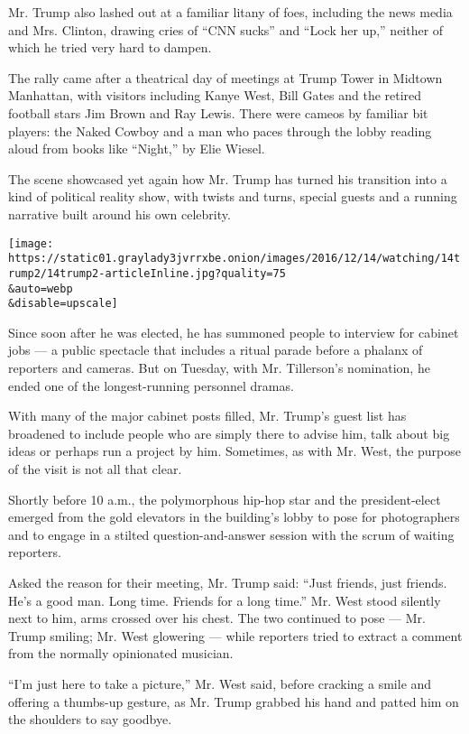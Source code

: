 Mr. Trump also lashed out at a familiar litany of foes, including the
news media and Mrs. Clinton, drawing cries of ``CNN sucks'' and ``Lock
her up,'' neither of which he tried very hard to dampen.

The rally came after a theatrical day of meetings at Trump Tower in
Midtown Manhattan, with visitors including Kanye West, Bill Gates and
the retired football stars Jim Brown and Ray Lewis. There were cameos by
familiar bit players: the Naked Cowboy and a man who paces through the
lobby reading aloud from books like ``Night,'' by Elie Wiesel.

The scene showcased yet again how Mr. Trump has turned his transition
into a kind of political reality show, with twists and turns, special
guests and a running narrative built around his own celebrity.

\texttt{[image: https://static01.graylady3jvrrxbe.onion/images/2016/12/14/watching/14trump2/14trump2-articleInline.jpg?quality=75\\\&auto=webp\\\&disable=upscale]}

Since soon after he was elected, he has summoned people to interview for
cabinet jobs --- a public spectacle that includes a ritual parade before
a phalanx of reporters and cameras. But on Tuesday, with Mr. Tillerson's
nomination, he ended one of the longest-running personnel dramas.

With many of the major cabinet posts filled, Mr. Trump's guest list has
broadened to include people who are simply there to advise him, talk
about big ideas or perhaps run a project by him. Sometimes, as with Mr.
West, the purpose of the visit is not all that clear.

Shortly before 10 a.m., the polymorphous hip-hop star and the
president-elect emerged from the gold elevators in the building's lobby
to pose for photographers and to engage in a stilted question-and-answer
session with the scrum of waiting reporters.

Asked the reason for their meeting, Mr. Trump said: ``Just friends, just
friends. He's a good man. Long time. Friends for a long time.'' Mr. West
stood silently next to him, arms crossed over his chest. The two
continued to pose --- Mr. Trump smiling; Mr. West glowering --- while
reporters tried to extract a comment from the normally opinionated
musician.

``I'm just here to take a picture,'' Mr. West said, before cracking a
smile and offering a thumbs-up gesture, as Mr. Trump grabbed his hand
and patted him on the shoulders to say goodbye.

